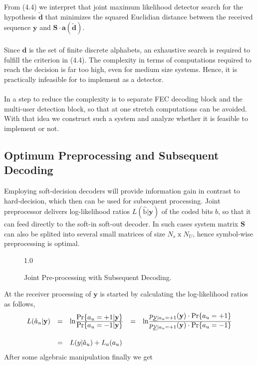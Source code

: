 From (4.4) we interpret that joint maximum likelihood detector search for the hypothesis $\mathrm{\tilde{\mathbf{d}}}$ that minimizes the squared Euclidian distance between the received sequence $\mathrm{\mathbf{y}}$ and $\mathrm{\mathbf{S\cdot a(\tilde{d})}}$. \\ \\
Since $\mathrm{\mathbf{d}}$ is the set of finite discrete alphabets, an exhaustive search is required to fulfill the criterion in (4.4). The complexity in terms of computations required to reach the decision is far too high, even for medium size systems. Hence, it is practically infeasible for to implement as a detector. \\ \\
In a step to reduce the complexity is to separate FEC decoding block and the multi-user detection block, so that at one stretch computations can be avoided. With that idea we construct such a system and analyze whether it is feasible to implement or not.
\subsection{Optimum Preprocessing and Subsequent Decoding}
Employing soft-decision decoders will provide information gain in contrast to hard-decision, which then can be used for subsequent processing. Joint preprocessor delivers log-likelihood ratios $L(\mathrm{\hat{b}}\vert \mathrm{\mathbf{y}})$ of the coded bits $b$, so that it can feed directly to the soft-in soft-out decoder. In such cases system matrix $\mathrm{\mathbf{S}}$ can also be splited into several small matrices of size $N_s\;\mathrm{x}\;N_U$, hence symbol-wise preprocessing is optimal.
\begin{figure}[htb]
\centerline{  {1.0} }
\caption{Joint Pre-processing with Subsequent Decoding.}
\end{figure}
At the receiver processing of $\mathrm{\mathbf{y}}$ is started by calculating the log-likelihood ratios as follows,
\begin{eqnarray}
\begin{array}{lllll}
L(\hat{a}_u\vert \mathrm{\mathbf{y}})&=&\mathrm{ln}\frac{\hbox{$\mathrm{Pr}\{a_u=+1 \vert \mathrm{\mathbf{y}}\}$}}{\hbox{$\mathrm{Pr}\{a_u=-1 \vert \mathrm{\mathbf{y}}\}$}}&=&\mathrm{ln}\frac{\hbox{$p_{\underline{\mathcal{Y}}\vert a_u=+1}(\mathrm{\mathbf{y}})\cdot \mathrm{Pr}\{a_u=+1\}$}}{\hbox{$p_{\underline{\mathcal{Y}}\vert a_u=+1}(\mathrm{\mathbf{y}})\cdot \mathrm{Pr}\{a_u=-1\}$}} \\ \\
&=&L(y\vert \hat{a}_u)+L_a(a_u)
\end{array}
\end{eqnarray}
After some algebraic manipulation finally we get

